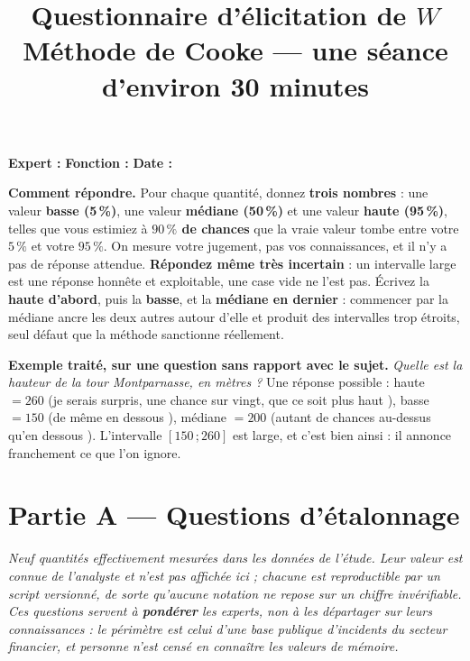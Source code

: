 \documentclass[11pt,a4paper]{article}
\title{\vspace{-1.3cm}\color{navy}\bfseries Questionnaire d'élicitation de $W$\\[2pt]
  \large Méthode de Cooke --- une séance d'environ 30 minutes}
\date{}
\begin{document}
\maketitle
\thispagestyle{fancy}   %
\vspace{-1.4cm}

\noindent\textbf{Expert :} \underline{\hspace{4.2cm}} \quad
\textbf{Fonction :} \underline{\hspace{4.2cm}} \quad
\textbf{Date :} \underline{\hspace{2.6cm}}

\vspace{0.25cm}
\begin{cle}
\textbf{Comment répondre.} Pour chaque quantité, donnez \textbf{trois nombres} : une valeur
\textbf{basse (5\,\%)}, une valeur \textbf{médiane (50\,\%)} et une valeur \textbf{haute
(95\,\%)}, telles que vous estimiez à \textbf{$90\,\%$ de chances} que la vraie valeur tombe
entre votre $5\,\%$ et votre $95\,\%$. On mesure votre jugement, pas vos connaissances, et il
n'y a pas de réponse attendue. \textbf{Répondez même très incertain} : un intervalle large est
une réponse honnête et exploitable, une case vide ne l'est pas. Écrivez la \textbf{haute
d'abord}, puis la \textbf{basse}, et la \textbf{médiane en dernier} : commencer par la médiane
ancre les deux autres autour d'elle et produit des intervalles trop étroits, seul défaut que la
méthode sanctionne réellement.
\end{cle}

\vspace{0.2cm}
\begin{mention}
\footnotesize
\textbf{Exemple traité, sur une question sans rapport avec le sujet.} \emph{Quelle est la
hauteur de la tour Montparnasse, en mètres ?} Une réponse possible : haute $=260$
(\og je serais surpris, une chance sur vingt, que ce soit plus haut \fg), basse $=150$
(\og de même en dessous \fg), médiane $=200$ (\og autant de chances au-dessus qu'en
dessous \fg). L'intervalle $[150\,;260]$ est large, et c'est bien ainsi : il annonce
franchement ce que l'on ignore.
\end{mention}

\section*{Partie A --- Questions d'étalonnage}
\footnotesize\emph{Neuf quantités effectivement mesurées dans les données de l'étude. Leur
valeur est connue de l'analyste et n'est pas affichée ici ; chacune est reproductible par un
script versionné, de sorte qu'aucune notation ne repose sur un chiffre invérifiable. Ces
questions servent à \textbf{pondérer} les experts, non à les départager sur leurs
connaissances : le périmètre est celui d'une base publique d'incidents du secteur financier,
et personne n'est censé en connaître les valeurs de mémoire.}
\normalsize
\end{document}
